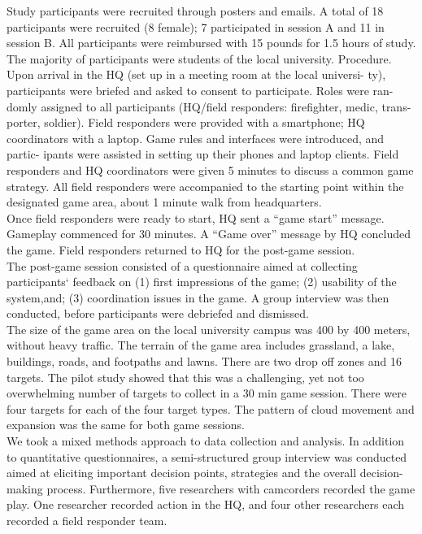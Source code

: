 Study participants were recruited through posters and emails. A total of 18 participants were recruited (8 female); 7 participated in session A and 11 in session B. All participants were reimbursed with 15 pounds for 1.5 hours of study. The majority of participants were students of the local university. Procedure. Upon arrival in the HQ (set up in a meeting room at the local universi- ty), participants were briefed and asked to consent to participate. Roles were ran- domly assigned to all participants (HQ/field responders: firefighter, medic, trans- porter, soldier). Field responders were provided with a smartphone; HQ coordinators with a laptop. Game rules and interfaces were introduced, and partic- ipants were assisted in setting up their phones and laptop clients. Field responders and HQ coordinators were given 5 minutes to discuss a common game strategy. All field responders were accompanied to the starting point within the designated game area, about 1 minute walk from headquarters.\\

Once field responders were ready to start, HQ sent a ``game start'' message. Gameplay commenced for 30 minutes. A ``Game over'' message by HQ concluded the game. Field responders returned to HQ for the post-game session.\\

The post-game session consisted of a questionnaire aimed at collecting participants` feedback on (1) first impressions of the game; (2) usability of the system,and; (3) coordination issues in the game. A group interview was then conducted, before participants were debriefed and dismissed.\\

The size of the game area on the local university campus was 400 by 400 meters, without heavy traffic. The terrain of the game area includes grassland, a lake, buildings, roads, and footpaths and lawns. There are two drop off zones and 16 targets. The pilot study showed that this was a challenging, yet not too overwhelming number of targets to collect in a 30 min game session. There were four targets for each of the four target types. The pattern of cloud movement and expansion was the same for both game sessions.\\

We took a mixed methods approach to data collection and analysis. In addition to quantitative questionnaires, a semi-structured group interview was conducted aimed at eliciting important decision points, strategies and the overall decision-making process. Furthermore, five researchers with camcorders recorded the game play. One researcher recorded action in the HQ, and four other researchers each recorded a field responder team.\\


